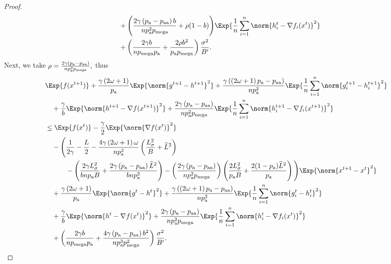 \documentclass{article}
\newcommand*{\probavailable}{\ensuremath{p_{\textnormal{a}}}}
\newcommand*{\probpairaa}{\ensuremath{p_{\textnormal{aa}}}}
\newcommand*{\probmega}{\ensuremath{p_{\text{mega}}}}
\begin{document}
\begin{proof}
\begin{align*}
    &\quad + \Bigg(\frac{2 \gamma \left(\probavailable - \probpairaa\right) b}{n \probavailable^2 \probmega} + \rho (1 - b)\Bigg)\Exp{\frac{1}{n}\sum_{i=1}^n\norm{h^{t}_i - \nabla f_i(x^{t})}^2} \\
    &\quad + \left(\frac{2 \gamma b}{n \probmega \probavailable} + \frac{2 \rho b^2}{\probavailable \probmega}\right) \frac{\sigma^2}{B'}.
  \end{align*}
  Next, we take $\rho = \frac{2 \gamma \left(\probavailable - \probpairaa\right)}{n \probavailable^2 \probmega},$ thus
  \begin{align*}
    &\Exp{f(x^{t + 1})} + \frac{\gamma \left(2 \omega + 1\right)}{\probavailable} \Exp{\norm{g^{t+1} - h^{t+1}}^2} + \frac{\gamma\left(\left(2 \omega + 1\right)\probavailable - \probpairaa\right)}{n \probavailable^2} \Exp{\frac{1}{n}\sum_{i=1}^n\norm{g^{t+1}_i - h^{t+1}_i}^2}\\
    &\quad  + \frac{\gamma}{b} \Exp{\norm{h^{t+1} - \nabla f(x^{t+1})}^2} + \frac{2 \gamma \left(\probavailable - \probpairaa\right)}{n \probavailable^2 \probmega} \Exp{\frac{1}{n}\sum_{i=1}^n\norm{h^{t+1}_i - \nabla f_i(x^{t+1})}^2}\\
    &\leq \Exp{f(x^t)} - \frac{\gamma}{2}\Exp{\norm{\nabla f(x^t)}^2} \\
    &\quad - \Bigg(\frac{1}{2\gamma} - \frac{L}{2} - \frac{4 \gamma \left(2\omega + 1\right) \omega}{n \probavailable^2}\left(\frac{L_{\sigma}^2}{B} + \widehat{L}^2\right) \\
    &\qquad\quad - \left(\frac{2 \gamma L_{\sigma}^2}{b n \probavailable B} + \frac{2\gamma\left(\probavailable - \probpairaa\right) \widehat{L}^2}{b n \probavailable^2}\right) - \left(\frac{2 \gamma \left(\probavailable - \probpairaa\right)}{n \probavailable^2 \probmega}\right) \left(\frac{2 L_{\sigma}^2}{\probavailable B} + \frac{2(1 - \probavailable) \widehat{L}^2}{\probavailable}\right)\Bigg) \Exp{\norm{x^{t+1} - x^t}^2} \\
    &\quad + \frac{\gamma \left(2 \omega + 1\right)}{\probavailable} \Exp{\norm{g^{t} - h^{t}}^2} + \frac{\gamma\left(\left(2 \omega + 1\right)\probavailable - \probpairaa\right)}{n \probavailable^2}\Exp{\frac{1}{n}\sum_{i=1}^n\norm{g^{t}_i - h^{t}_i}^2} \\
    &\quad + \frac{\gamma}{b} \Exp{\norm{h^{t} - \nabla f(x^{t})}^2} + \frac{2 \gamma \left(\probavailable - \probpairaa\right)}{n \probavailable^2 \probmega}\Exp{\frac{1}{n}\sum_{i=1}^n\norm{h^{t}_i - \nabla f_i(x^{t})}^2} \\
    &\quad + \left(\frac{2 \gamma b}{n \probmega \probavailable} + \frac{4 \gamma \left(\probavailable - \probpairaa\right) b^2}{n \probavailable^3 \probmega^2}\right) \frac{\sigma^2}{B'}.

\end{align*}
\end{proof}
\end{document}
